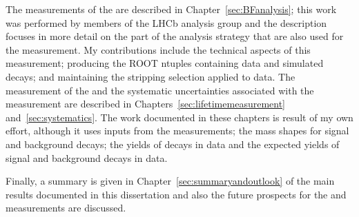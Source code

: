 The measurements of the \bmumu \BFs are described in Chapter~\ref{sec:BFanalysis}; this work was performed by members of the \bmumu LHCb analysis group and the description focuses in more detail on the part of the analysis strategy that are also used for the \el measurement. My contributions include the technical aspects of this measurement; producing the ROOT ntuples containing data and simulated decays; and maintaining the stripping selection applied to data. 
The measurement of the \bsmumu \el and the systematic uncertainties associated with the measurement are described in Chapters~\ref{sec:lifetimemeasurement} and~\ref{sec:systematics}. 
The work documented in these chapters is result of my own effort, although it uses inputs from the \BF measurements; the mass shapes for signal and background decays; the yields of \bsjpsiphi decays in data and the expected yields of signal and background decays in data. %

Finally, a summary is given in Chapter~\ref{sec:summaryandoutlook} of the main results documented in this dissertation and also the future prospects for the \BF and \el measurements are discussed. 

